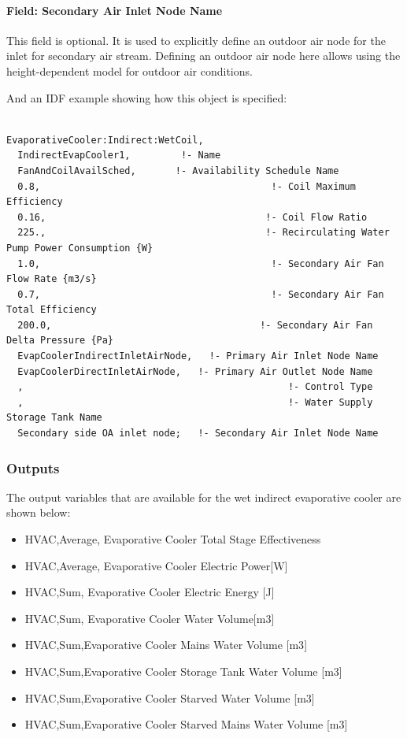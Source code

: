\paragraph{Field: Secondary Air Inlet Node Name}\label{field-secondary-air-inlet-node-name-1-000}

This field is optional. It is used to explicitly define an outdoor air node for the inlet for secondary air stream. Defining an outdoor air node here allows using the height-dependent model for outdoor air conditions.

And an IDF example showing how this object is specified:

\begin{lstlisting}

EvaporativeCooler:Indirect:WetCoil,
  IndirectEvapCooler1,         !- Name
  FanAndCoilAvailSched,       !- Availability Schedule Name
  0.8,                                         !- Coil Maximum Efficiency
  0.16,                                       !- Coil Flow Ratio
  225.,                                       !- Recirculating Water Pump Power Consumption {W}
  1.0,                                         !- Secondary Air Fan Flow Rate {m3/s}
  0.7,                                         !- Secondary Air Fan Total Efficiency
  200.0,                                     !- Secondary Air Fan Delta Pressure {Pa}
  EvapCoolerIndirectInletAirNode,   !- Primary Air Inlet Node Name
  EvapCoolerDirectInletAirNode,   !- Primary Air Outlet Node Name
  ,                                               !- Control Type
  ,                                               !- Water Supply Storage Tank Name
  Secondary side OA inlet node;   !- Secondary Air Inlet Node Name
\end{lstlisting}

\subsubsection{Outputs}\label{outputs-3-006}

The output variables that are available for the wet indirect evaporative cooler are shown below:

\begin{itemize}
\item
  HVAC,Average, Evaporative Cooler Total Stage Effectiveness
\item
  HVAC,Average, Evaporative Cooler Electric Power{[}W{]}
\item
  HVAC,Sum, Evaporative Cooler Electric Energy {[}J{]}
\item
  HVAC,Sum, Evaporative Cooler Water Volume{[}m3{]}
\item
  HVAC,Sum,Evaporative Cooler Mains Water Volume {[}m3{]}
\item
  HVAC,Sum,Evaporative Cooler Storage Tank Water Volume {[}m3{]}
\item
  HVAC,Sum,Evaporative Cooler Starved Water Volume {[}m3{]}
\item
  HVAC,Sum,Evaporative Cooler Starved Mains Water Volume {[}m3{]}
\end{itemize}


